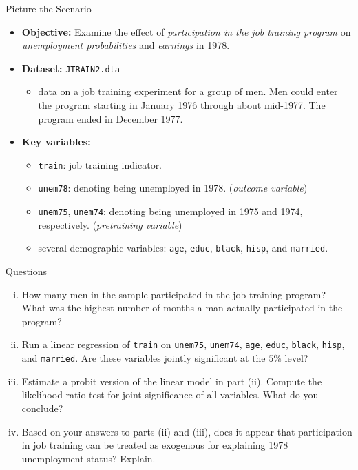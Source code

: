 \documentclass[
  10pt,
  ignorenonframetext,
]{beamer}
\providecommand{\tightlist}{%
  \setlength{\itemsep}{0pt}\setlength{\parskip}{0pt}}
\begin{document}
\begin{frame}[fragile]{Picture the Scenario}
\protect\hypertarget{picture-the-scenario}{}
\begin{itemize}
\item
  \textbf{Objective:} Examine the effect of \emph{participation in the
  job training program} on \emph{unemployment probabilities} and
  \emph{earnings} in 1978.
\item
  \textbf{Dataset:} \texttt{JTRAIN2.dta}

  \begin{itemize}
  \tightlist
  \item
    data on a job training experiment for a group of men. Men could
    enter the program starting in January 1976 through about mid-1977.
    The program ended in December 1977.
  \end{itemize}
\item
  \textbf{Key variables:}

  \begin{itemize}
  \tightlist
  \item
    \texttt{train}: job training indicator.
  \item
    \texttt{unem78}: denoting being unemployed in 1978. (\emph{outcome
    variable})
  \item
    \texttt{unem75}, \texttt{unem74}: denoting being unemployed in 1975
    and 1974, respectively. (\emph{pretraining variable})
  \item
    several demographic variables: \texttt{age}, \texttt{educ},
    \texttt{black}, \texttt{hisp}, and \texttt{married}.
  \end{itemize}
\end{itemize}
\end{frame}

\begin{frame}[fragile]{Questions}
\protect\hypertarget{questions}{}
\begin{enumerate}
[(i)]
\item
  How many men in the sample participated in the job training program?
  What was the highest number of months a man actually participated in
  the program?
\item
  Run a linear regression of \texttt{train} on \texttt{unem75},
  \texttt{unem74}, \texttt{age}, \texttt{educ}, \texttt{black},
  \texttt{hisp}, and \texttt{married}. Are these variables jointly
  significant at the \(5\%\) level?
\item
  Estimate a probit version of the linear model in part (ii). Compute
  the likelihood ratio test for joint significance of all variables.
  What do you conclude?
\item
  Based on your answers to parts (ii) and (iii), does it appear that
  participation in job training can be treated as exogenous for
  explaining 1978 unemployment status? Explain.
\end{enumerate}
\end{frame}
\end{document}
